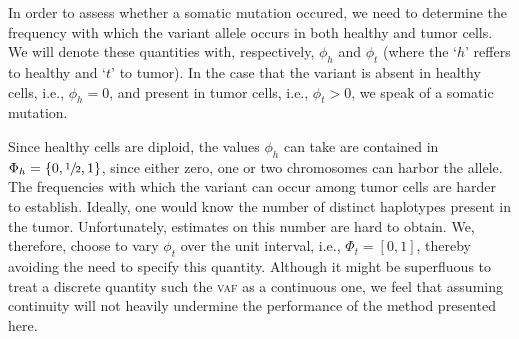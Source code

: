 \documentclass[a4paper,12pt]{article}
\begin{document}
In order to assess whether a somatic mutation occured, we need to determine the frequency with which the variant allele occurs in both healthy and tumor cells. We will denote these quantities with, respectively, $\phi_h$ and $\phi_t$ (where the `$h$' reffers to healthy and `$t$' to tumor). In the case that the variant is absent in healthy cells, i.e., $\phi_h = 0$, and present in tumor cells, i.e., $\phi_t > 0$, we speak of a somatic mutation. 

Since healthy cells are diploid, the values $\phi_h$ can take are contained in $\Phi_h = \{0, \sfrac{1}{2}, 1\}$, since either zero, one or two chromosomes can harbor the allele. The frequencies with which the variant can occur among tumor cells are harder to establish. Ideally, one would know the number of distinct haplotypes present in the tumor. Unfortunately, estimates on this number are hard to obtain. We, therefore, choose to vary $\phi_t$ over the unit interval, i.e., $\Phi_t = [0,1]$, thereby avoiding the need to specify this quantity. Although it might be superfluous to treat a discrete quantity such the \textsc{vaf} as a continuous one, we feel that assuming continuity will not heavily undermine the performance of the method presented here.  
\end{document}
